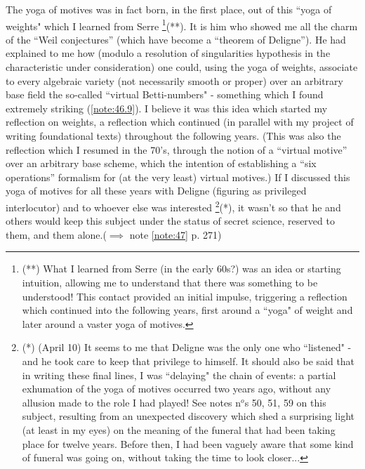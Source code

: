 The yoga of motives was in fact born, in the first place, out of this ``yoga of weights"
which I learned from Serre
\footnote{(**) What I learned from Serre (in the early 60s?) was an idea or starting intuition, allowing me to understand that there was something to be understood! This contact provided an initial impulse, triggering a reflection which continued into the following years, first around a ``yoga" of weight and later around a vaster yoga of motives.}(**).
It is him who showed me all the charm of the ``Weil conjectures'' (which have become
a ``theorem of Deligne''). 
He had explained to me how (modulo a resolution of singularities hypothesis in the
characteristic under consideration)
one could, using the yoga of weights, associate to every algebraic variety (not
necessarily smooth or proper) over an arbitrary base field 
the so-called ``virtual Betti-numbers" - something 
which I found extremely striking (\ref{note:46.9}).
I believe it was this idea which started my reflection on weights, a reflection which
continued (in parallel with my project of writing foundational texts)
throughout the following years. 
(This was also the reflection which I resumed in the 70's, through the notion of a ``virtual
motive'' over an arbitrary
base
scheme, which the intention of establishing a ``six operations'' formalism for (at the
very least) virtual motives.) If I discussed this yoga of motives for all these years with
Deligne (figuring as privileged interlocutor) and to whoever else was
interested
\footnote{(*) (April 10) It seems to me that Deligne was the only one who ``listened" - and he took care to keep that privilege to himself. It should also be said that in writing these final lines, I was ``delaying" the chain of events: a partial exhumation of the yoga of motives occurred two years ago, without any allusion made to the role I had played! See notes n$^o$s 50, 51, 59 on this subject, resulting from an unexpected discovery which shed a surprising light (at least in my eyes) on the meaning of the funeral that had been taking place for twelve years. Before then, I had been vaguely aware that some kind of funeral was going on, without taking the time to look closer...}(*),
it wasn't so that he and others would keep this subject under the status of secret
science, reserved to them, and them alone.($\implies$ note \ref{note:47} p. 271)

\label{note:46.1}

